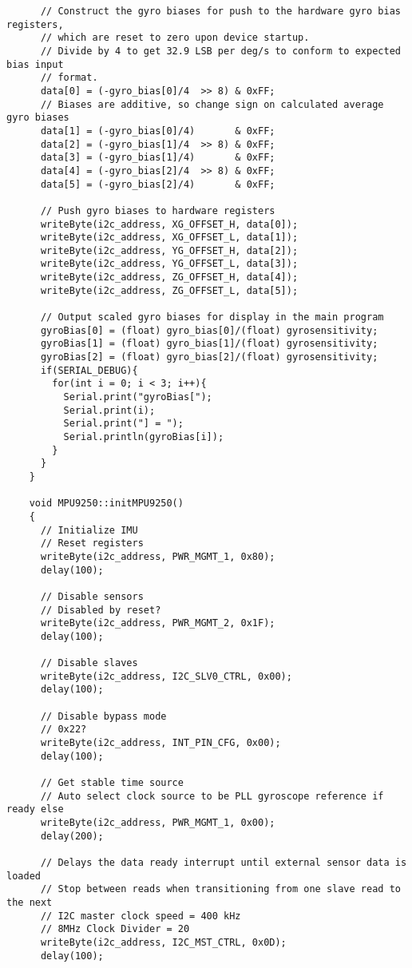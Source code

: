 \begin{lstlisting}
	  // Construct the gyro biases for push to the hardware gyro bias registers,
	  // which are reset to zero upon device startup.
	  // Divide by 4 to get 32.9 LSB per deg/s to conform to expected bias input
	  // format.
	  data[0] = (-gyro_bias[0]/4  >> 8) & 0xFF;
	  // Biases are additive, so change sign on calculated average gyro biases
	  data[1] = (-gyro_bias[0]/4)       & 0xFF;
	  data[2] = (-gyro_bias[1]/4  >> 8) & 0xFF;
	  data[3] = (-gyro_bias[1]/4)       & 0xFF;
	  data[4] = (-gyro_bias[2]/4  >> 8) & 0xFF;
	  data[5] = (-gyro_bias[2]/4)       & 0xFF;

	  // Push gyro biases to hardware registers
	  writeByte(i2c_address, XG_OFFSET_H, data[0]);
	  writeByte(i2c_address, XG_OFFSET_L, data[1]);
	  writeByte(i2c_address, YG_OFFSET_H, data[2]);
	  writeByte(i2c_address, YG_OFFSET_L, data[3]);
	  writeByte(i2c_address, ZG_OFFSET_H, data[4]);
	  writeByte(i2c_address, ZG_OFFSET_L, data[5]);

	  // Output scaled gyro biases for display in the main program
	  gyroBias[0] = (float) gyro_bias[0]/(float) gyrosensitivity;
	  gyroBias[1] = (float) gyro_bias[1]/(float) gyrosensitivity;
	  gyroBias[2] = (float) gyro_bias[2]/(float) gyrosensitivity;
	  if(SERIAL_DEBUG){
	    for(int i = 0; i < 3; i++){
	      Serial.print("gyroBias[");
	      Serial.print(i);
	      Serial.print("] = ");
	      Serial.println(gyroBias[i]);
	    }
	  }
	}

	void MPU9250::initMPU9250()
	{
	  // Initialize IMU
	  // Reset registers
	  writeByte(i2c_address, PWR_MGMT_1, 0x80);
	  delay(100);
	  
	  // Disable sensors
	  // Disabled by reset?
	  writeByte(i2c_address, PWR_MGMT_2, 0x1F);
	  delay(100);
	  
	  // Disable slaves
	  writeByte(i2c_address, I2C_SLV0_CTRL, 0x00);
	  delay(100);
	  
	  // Disable bypass mode
	  // 0x22?
	  writeByte(i2c_address, INT_PIN_CFG, 0x00);
	  delay(100);
	  
	  // Get stable time source
	  // Auto select clock source to be PLL gyroscope reference if ready else
	  writeByte(i2c_address, PWR_MGMT_1, 0x00);
	  delay(200);

	  // Delays the data ready interrupt until external sensor data is loaded
	  // Stop between reads when transitioning from one slave read to the next
	  // I2C master clock speed = 400 kHz
	  // 8MHz Clock Divider = 20
	  writeByte(i2c_address, I2C_MST_CTRL, 0x0D);
	  delay(100);


\end{lstlisting}
